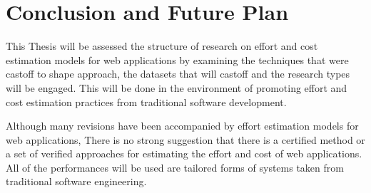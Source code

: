 \chapter{Conclusion and Future Plan}
This Thesis will be assessed the structure of research on effort and cost estimation models for web applications by examining the techniques that were castoff to shape approach, the datasets that will  castoff and the research types will be engaged. This will be done in the environment of promoting effort and cost estimation practices from traditional software development.

Although many revisions have been accompanied by effort estimation models for web applications, There is no strong suggestion that there is a certified method or a set of verified approaches for estimating the effort and cost of web applications. All of the performances will be used are tailored forms of systems taken from traditional software engineering.



